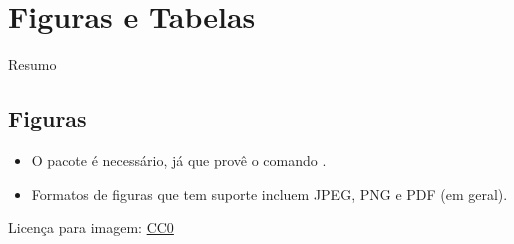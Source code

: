 \documentclass{beamer}
\begin{document}
\section{Figuras e Tabelas}

\begin{frame}{Resumo}
\begin{multicols}{2}
\tableofcontents[currentsection]
\end{multicols}
\end{frame}

\subsection{Figuras}
\begin{frame}[fragile]{\insertsubsection}
\begin{itemize}
\item O pacote  é necessário, já que provê o comando
.
\item Formatos de figuras que tem suporte incluem JPEG, PNG e PDF (em geral). 
\end{itemize}

\tiny{Licença para imagem: \href{https://pixabay.com/en/animal-apple-attractive-beautiful-1239390/}{CC0}}
\end{frame}
\end{document}
